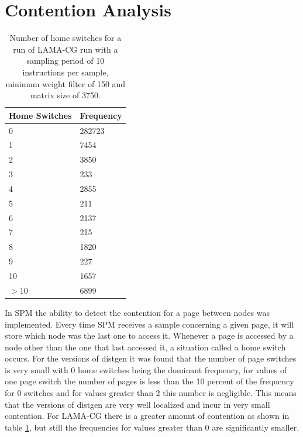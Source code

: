\section{Contention Analysis}\label{section:rescont}

\begin{table}
	\centering
		\begin{tabularx}{.5\textwidth}{|l|X|}
		\hline
			Home Switches & Frequency   \\
			\hline
			0 & 282723
   \\
			\hline
			1 & 7454
   \\
			\hline
			2 & 3850 \\
			\hline
			3 & 233  \\
			\hline
			4 & 2855  \\
			\hline
			5 & 211  \\
			\hline
			6 & 2137  \\
			\hline
			7 & 215  \\
			\hline
			8 & 1820  \\
			\hline
			9 & 227  \\
			\hline
			10 & 1657 \\
			\hline
			$>$10 & 6899 \\
			\hline
		\end{tabularx}
		\caption{Number of home switches for a run of LAMA-CG run with a sampling period of 10 instructions per sample, minimum weight filter of 150 and matrix size of 3750.}
		\label{table:res-dgencontent}
\end{table}

In SPM the ability to detect the contention for a page between nodes was implemented. Every time SPM receives a sample concerning a given page, it will store which node was the last one to access it. Whenever a page is accessed by a node other than the one that last accessed it, a situation called a home switch occurs. For the versions of distgen it was found that the number of page switches is very small with 0 home switches being the dominant frequency, for values of one page switch the number of pages is less than the 10 percent of the frequency for 0 switches and for values greater than 2 this number is negligible. This means that the versions of distgen are very well localized and incur in very small contention. For LAMA-CG there is a greater amount of contention as shown in table \ref{table:res-dgencontent}, but still the frequencies for values greater than 0 are significantly smaller.
\FloatBarrier
